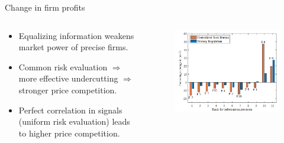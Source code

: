 \documentclass[10pt,aspectratio=169]{beamer}
\begin{document}
\begin{frame}{Change in firm profits}
\begin{columns}[t]
\begin{column}{0.44\textwidth}
\begin{itemize}
  \item Equalizing information weakens market power of precise firms.  %
  \item Common risk evaluation $\Rightarrow$ more effective undercutting $\Rightarrow$ stronger price competition.
  \item Perfect correlation in signals (uniform risk evaluation) leads to higher price competition.
\end{itemize}
\end{column}
\begin{column}{0.51\textwidth}
\vspace{-0.3cm}
\begin{figure}[H]
\centering
\includegraphics[width=\textwidth]{Figures/Fig5.png}
\end{figure}
\end{column}
\end{columns}
\end{frame}
\end{document}
